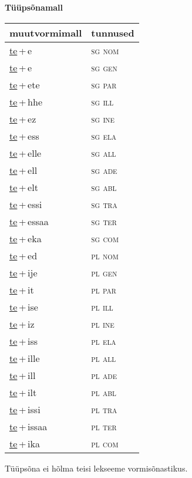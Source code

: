 
\vspace{1.8em}
\begin{minipage}{\textwidth}
\textbf{Tüüpsõnamall \,}\\

\begin{sideways}
\begin{tabular}{l l}
muutvormimall & tunnused \\
\hline
\underline{te}\,+\,e & \textsc{ sg nom } \\
\underline{te}\,+\,e & \textsc{ sg gen } \\
\underline{te}\,+\,ete & \textsc{ sg par } \\
\underline{te}\,+\,hhe & \textsc{ sg ill } \\
\underline{te}\,+\,ez & \textsc{ sg ine } \\
\underline{te}\,+\,ess & \textsc{ sg ela } \\
\underline{te}\,+\,elle & \textsc{ sg all } \\
\underline{te}\,+\,ell & \textsc{ sg ade } \\
\underline{te}\,+\,elt & \textsc{ sg abl } \\
\underline{te}\,+\,essi & \textsc{ sg tra } \\
\underline{te}\,+\,essaa & \textsc{ sg ter } \\
\underline{te}\,+\,eka & \textsc{ sg com } \\
\underline{te}\,+\,ed & \textsc{ pl nom } \\
\underline{te}\,+\,ije & \textsc{ pl gen } \\
\underline{te}\,+\,it & \textsc{ pl par } \\
\underline{te}\,+\,ise & \textsc{ pl ill } \\
\underline{te}\,+\,iz & \textsc{ pl ine } \\
\underline{te}\,+\,iss & \textsc{ pl ela } \\
\underline{te}\,+\,ille & \textsc{ pl all } \\
\underline{te}\,+\,ill & \textsc{ pl ade } \\
\underline{te}\,+\,ilt & \textsc{ pl abl } \\
\underline{te}\,+\,issi & \textsc{ pl tra } \\
\underline{te}\,+\,issaa & \textsc{ pl ter } \\
\underline{te}\,+\,ika & \textsc{ pl com } \\
\end{tabular}
\end{sideways}
\label{tab:tüüpsõnamall-tee}

\end{minipage}

 
\vspace{1em}
\noindent Tüüpsõna ei hõlma teisi lekseeme vormi\-sõnastikus.
